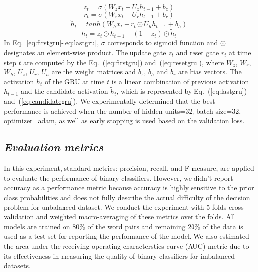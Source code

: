 \documentclass{amia}
\begin{document}
\begin{equation}
z_t = \sigma(W_zx_t + U_zh_{t-1} + b_z)
\label{eq:firstgru}
\end{equation}
\begin{equation}
r_t = \sigma(W_rx_t + U_rh_{t-1} + b_r)
\label{eq:resetgru}
\end{equation}
\begin{equation}
\tilde h_t = tanh(W_hx_t + r_t \odot U_hh_{t-1} + b_h) 
\label{eq:candidategru}
\end{equation}
\begin{equation}
h_t = z_t \odot h_{t-1} + (1-z_t) \odot \tilde h_t
\label{eq:lastgru}
\end{equation}  
In Eq.~\ref{eq:firstgru}-\ref{eq:lastgru}, $\sigma$ corresponds to sigmoid function and $\odot$ designates an element-wise product. The update gate $z_t$ and reset gate $r_t$ at time step $t$ are computed by the Eq.~(\ref{eq:firstgru}) and~(\ref{eq:resetgru}), where $W_z$, $W_r$, $W_h$, $U_z$, $U_r$, $U_h$ are the weight matrices and $b_z$, $b_h$ and $b_r$ are bias vectors. The activation $h_t$ of the GRU at time $t$ is a linear combination of previous activation $h_{t-1}$ and the candidate activation $\tilde h_t$, which is represented by Eq.~(\ref{eq:lastgru}) and~(\ref{eq:candidategru}). We experimentally determined that the best performance is achieved when the number of hidden units=32, batch size=32, optimizer=adam, as well as early stopping is used based on the validation loss.         
  
\subsection*{\textit{Evaluation metrics}}
In this experiment, standard metrics: precision, recall, and F-measure, are applied to evaluate the performance of binary classifiers\cite{aas1999text}. However, we didn't report accuracy as a performance metric because accuracy is highly sensitive to the prior class probabilities and does not fully describe the actual difficulty of the decision problem for unbalanced dataset. We conduct the experiment with 5 folds cross-validation and weighted macro-averaging of these metrics over the folds. All models are trained on 80\% of the word pairs and remaining 20\% of the data is used as a test set for reporting the performance of the model. We also estimated the area under the receiving operating characterstics curve (AUC) metric due to its effectiveness in measuring the quality of binary classifiers for imbalanced datasets\cite{hu2015kernelized}. 
\end{document}
